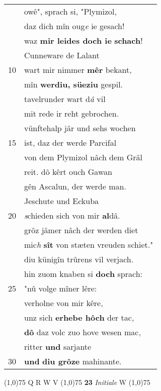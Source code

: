 \documentclass[8pt,a4paper,notitlepage]{article}
\begin{document}
\begin{table}[ht]
\begin{minipage}[t]{0.5\linewidth}
\begin{tabular}{rl}
 & owê", sprach si, "Plymizol,\\ 
 & daz dich mîn oug\textit{e} ie gesach!\\ 
 & waz \textbf{mir leides doch ie} \textbf{schach}!\\ 
 & Cunneware de Lalant\\ 
10 & wart mir nimmer \textbf{mêr} bekant,\\ 
 & mîn \textbf{werdiu, süeziu} gespil.\\ 
 & tavelrunder wart d\textit{â} vil\\ 
 & mit rede ir reht gebrochen.\\ 
 & vünftehalp jâr und sehs wochen\\ 
15 & ist, daz der werde Parcifal\\ 
 & von dem Plymizol nâch dem Grâl\\ 
 & reit. dô kêrt ouch Gawan\\ 
 & gên Ascalun, der werde man.\\ 
 & Jeschute und Eckuba\\ 
20 & \textit{s}chieden sich von mir \textbf{al}dâ.\\ 
 & grôz jâmer nâch der werden diet\\ 
 & mic\textit{h} \textbf{sît} von stæten vreuden schiet."\\ 
 & diu künigîn trûrens vil verjach.\\ 
 & hin zuom knaben si \textbf{doch} sprach:\\ 
25 & "nû volge mîner lêre:\\ 
 & verholne von mir kêre,\\ 
 & unz sich \textbf{erhebe hôch} der tac,\\ 
 & \textbf{dô} daz volc zuo hove wesen mac,\\ 
 & ritter \textbf{und} sarjante\\ 
30 & \textbf{und} \textbf{diu grôze} mahinante.\\ 
\end{tabular}
\scriptsize
\line(1,0){75} \newline
Q R W V \newline
\line(1,0){75} \newline
\textbf{23} \textit{Initiale} W  \newline
\line(1,0){75} \newline

\end{minipage}
\end{table}
\end{document}
